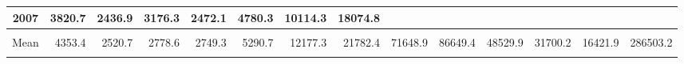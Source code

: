 \begin{longtable}[t]{crrrrrrrrrrrrr}
2007 & 3820.7 & 2436.9 & 3176.3 & 2472.1 & 4780.3 & 10114.3 & 18074.8 & \cellcolor{green}{70987.8} &  &  &  &  & \cellcolor{green}{115863.3}\\
\midrule
\cellcolor{red}{Max} & \cellcolor{red}{6991.4} & \cellcolor{red}{3116.5} & \cellcolor{red}{3642.7} & \cellcolor{red}{3649.3} & \cellcolor{red}{6632.9} & \cellcolor{red}{18876.1} & \cellcolor{red}{31618.6} & \cellcolor{red}{72151.6} & \cellcolor{red}{109987.6} & \cellcolor{red}{63322} & \cellcolor{red}{40759.3} & \cellcolor{red}{26444.5} & \cellcolor{red}{370554.7}\\
Mean & 4353.4 & 2520.7 & 2778.6 & 2749.3 & 5290.7 & 12177.3 & 21782.4 & 71648.9 & 86649.4 & 48529.9 & 31700.2 & 16421.9 & 286503.2\\
\cellcolor{green}{Min} & \cellcolor{green}{2612.3} & \cellcolor{green}{2082.2} & \cellcolor{green}{2323.8} & \cellcolor{green}{2122.3} & \cellcolor{green}{4420.8} & \cellcolor{green}{8363.9} & \cellcolor{green}{15565} & \cellcolor{green}{70987.8} & \cellcolor{green}{57411.1} & \cellcolor{green}{32013.4} & \cellcolor{green}{23651.4} & \cellcolor{green}{11781} & \cellcolor{green}{115863.3}\\*
\end{longtable}
